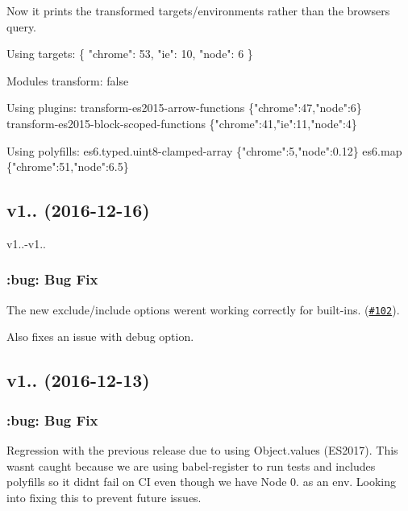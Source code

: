 Now it prints the transformed targets/environments rather than the browsers query.


\begin{DoxyCode}
Using targets:
\{
  \textcolor{stringliteral}{"chrome"}: 53,
  \textcolor{stringliteral}{"ie"}: 10,
  \textcolor{stringliteral}{"node"}: 6
\}

Modules transform: \textcolor{keyword}{false}

Using plugins:
  transform-es2015-arrow-functions \{\textcolor{stringliteral}{"chrome"}:47,\textcolor{stringliteral}{"node"}:6\}
  transform-es2015-block-scoped-functions \{\textcolor{stringliteral}{"chrome"}:41,\textcolor{stringliteral}{"ie"}:11,\textcolor{stringliteral}{"node"}:4\}

Using polyfills:
  es6.typed.uint8-clamped-array \{\textcolor{stringliteral}{"chrome"}:5,\textcolor{stringliteral}{"node"}:0.12\}
  es6.map \{\textcolor{stringliteral}{"chrome"}:51,\textcolor{stringliteral}{"node"}:6.5\}
\end{DoxyCode}


\subsection*{v1.. (2016-\/12-\/16)}

v1..-\/v1..

\subsubsection*{\+:bug\+: Bug Fix}

The new {\ttfamily exclude}/{\ttfamily include} options weren\textquotesingle{}t working correctly for built-\/ins. (\href{https://github.com/babel/babel-preset-env/pull/102}{\tt \#102}).

Also fixes an issue with debug option.

\subsection*{v1.. (2016-\/12-\/13)}

\subsubsection*{\+:bug\+: Bug Fix}

Regression with the previous release due to using {\ttfamily Object.\+values} (E\+S2017). This wasn\textquotesingle{}t caught because we are using babel-\/register to run tests and includes polyfills so it didn\textquotesingle{}t fail on CI even though we have Node 0. as an env. Looking into fixing this to prevent future issues.

